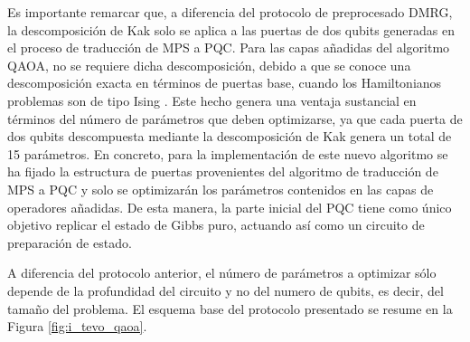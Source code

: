 Es importante remarcar que, a diferencia del protocolo de preprocesado DMRG, la descomposición de Kak solo se aplica a las puertas de dos qubits generadas en el proceso de traducción de MPS a \mbox{PQC}. Para las capas añadidas del algoritmo QAOA, no se requiere dicha descomposición, debido a que se conoce una descomposición exacta en términos de puertas base, cuando los Hamiltonianos problemas son de tipo Ising \citep{jack}. Este hecho genera una ventaja sustancial en términos del número de parámetros que deben optimizarse, ya que cada puerta de dos qubits descompuesta mediante la descomposición de Kak genera un total de 15 parámetros. En concreto, para la implementación de este nuevo algoritmo se ha fijado la estructura de puertas provenientes del algoritmo de traducción de MPS a \mbox{PQC} y solo se optimizarán los parámetros contenidos en las capas de operadores añadidas. De esta manera, la parte inicial del \mbox{PQC} tiene como único objetivo replicar el estado de Gibbs puro, actuando así como un circuito de preparación de estado. 

\newpage

A diferencia del protocolo anterior, el número de parámetros a optimizar sólo depende de la profundidad del circuito y no del numero de qubits, es decir, del tamaño del problema. El esquema base del protocolo presentado se resume en la Figura \ref{fig:i_tevo_qaoa}.

